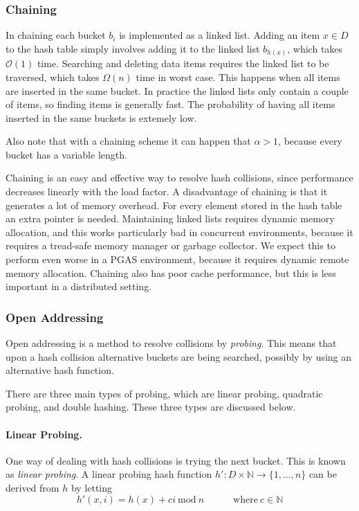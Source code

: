 \subsubsection{Chaining}
In chaining each bucket $b_i$ is implemented as a linked list. Adding an item $x \in D$ to the hash table simply involves adding it to the linked list $b_{h(x)}$, which takes $\mathcal{O}(1)$ time. Searching and deleting data items requires the linked list to be traversed, which takes $\Omega(n)$ time in worst case. This happens when all items are inserted in the same bucket. In practice the linked lists only contain a couple of items, so finding items is generally fast. The probability of having all items inserted in the same buckets is extemely low.

Also note that with a chaining scheme it can happen that $\alpha > 1$, because every bucket has a variable length. 

Chaining is an easy and effective way to resolve hash collisions, since performance decreases linearly with the load factor. A disadvantage of chaining is that it generates a lot of memory overhead. For every element stored in the hash table an extra pointer is needed. Maintaining linked lists requires dynamic memory allocation, and this works particularly bad in concurrent environments, because it requires a tread-safe memory manager or garbage collector. We expect this to perform even worse in a PGAS environment, because it requires dynamic remote memory allocation. Chaining also has poor cache performance, but this is less important in a distributed setting.

\subsubsection{Open Addressing}
Open addressing is a method to resolve collisions by \emph{probing}. This means that upon a hash collision alternative buckets are being searched, possibly by using an alternative hash function.

There are three main types of probing, which are linear probing, quadratic probing, and double hashing. These three types are discussed below.

\paragraph{Linear Probing.}
One way of dealing with hash collisions is trying the next bucket. This is known as \emph{linear probing}. A linear probing hash function $h' : D \times \mathbb{N} \rightarrow \{ 1, \dots, n \}$ can be derived from $h$ by letting \cite{Cormen:2009:IAT:1614191} 
\begin{equation}
	h'(x, i) = h(x) + ci \ \text{mod} \ n \hspace{36pt} \text{where} \ c \in \mathbb{N}
\end{equation}

